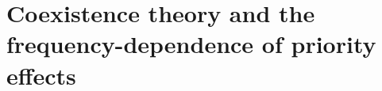 \chapter{Coexistence theory and the frequency-dependence of priority effects}
\fancyhead[LE, RO]{\thepage}
\fancyfoot{}
\renewcommand{\headrulewidth}{0pt}
\setlength{\parindent}{1cm}

